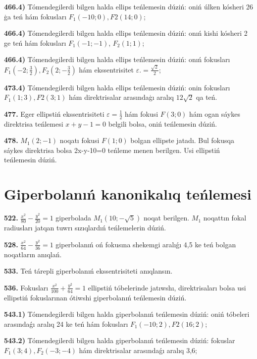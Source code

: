 \textbf{466.4)} Tómendegilerdi bilgen halda ellips teńlemesin dúziń: oniń úlken kósheri 26 ģa teń hám fokusları $F_1 (-10; 0), F2 (14; 0) $;

\textbf{466.4)} Tómendegilerdi bilgen halda ellips teńlemesin dúziń: onıń kishi kósheri 2 ge teń hám fokusları $F_1 (-1;-1) $, $F_2 (1; 1) $;

\textbf{466.4)} Tómendegilerdi bilgen halda ellips teńlemesin dúziń: onıń fokusları $F_1\left (-2; \frac{3}{2}\right), F_2\left (2;-\frac{3}{2}\right) $ hám ekssentrisitet $\varepsilon.=\frac{\sqrt{2}}{2}$;

\textbf{473.4)} Tómendegilerdi bilgen halda ellips teńlemesin dúziń: onin fokusları $F_1 (1; 3), F2 (3; 1) $ hám direktrisalar arasındaģı aralıq $12 \sqrt{2}$ qa teń.

\textbf {477.} Eger ellipstiń ekssentrisiteti $\varepsilon=\frac{1}{2}$ hám fokusi $F (3; 0) $ hám ogan sáykes direktrisa teńlemesi $x+y-1=0$ belgili bolsa, oniń teńlemesin dúziń.

\textbf {478.} $M_1 (2;-1) $ noqatı fokusi $F (1;0) $ bolgan ellipste jatadı. Bul fokusqa sáykes direktrisa bolsa 2x-y-10=0 teńleme menen berilgen. Usi ellipstiń teńlemesin dúziń.


\section{Giperbolanıń kanonikalıq teńlemesi}


\textbf{522.} $\frac{x^2}{80}-\frac{y^2}{20}=1$ giperbolada $M_1 (10;-\sqrt{5}) $ noqat berilgen. $M_1$ noqattın fokal radiusları jatqan tuwrı sızıqlardıń teńlemelerin dúziń.

\textbf {528.} $\frac{x^2}{64}-\frac{y^2}{36}=1$ giperbolanıń oń fokusına shekemgi aralıǵı 4,5 ke teń bolgan noqatların anıqlań.

\textbf {533.} Teń tárepli giperbolanıń ekssentrisiteti anıqlansın.

\textbf {536.} Fokusları $\frac{x^2}{100}+\frac{y^2}{64}=1$ ellipstiń tóbelerinde jatıwshı, direktrisaları bolsa usi ellipstiń fokuslarınan ótiwshi giperbolanıń teńlemesin dúziń.

\textbf{543.1)} Tómendegilerdi bilgen halda giperbolanıń teńlemesin dúziń: oniń tóbeleri arasındaǵı aralıq 24 ke teń hám fokusları $F_1 (-10; 2), F2 (16; 2) $;

\textbf{543.2) } Tómendegilerdi bilgen halda giperbolanıń teńlemesin dúziń: fokuslar $F_1 (3; 4), F_2 (-3;-4) $ hám direktrisalar arasındaǵı aralıq 3,6;

